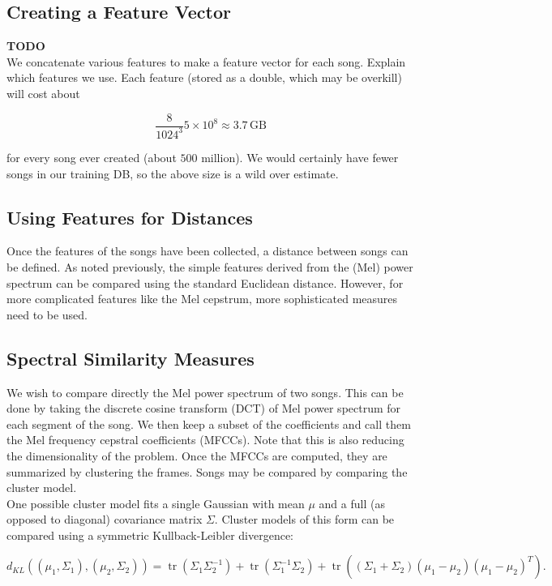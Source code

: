 \documentclass[12pt]{article}
\begin{document}
\subsection{Creating a Feature Vector}
\textbf{TODO}\\
We concatenate various features to make a feature vector for each song.  Explain which features we use.  Each feature (stored as a double, which may be overkill) will cost about 

\[ \dfrac{8}{1024^3}5\times10^8 \approx 3.7\,\text{GB} \] 

\noindent for every song ever created (about $500$ million).  We would certainly have fewer songs in our training DB, so the above size is a wild over estimate.

\subsection{Using Features for Distances}

Once the features of the songs have been collected, a distance between songs can be defined.  As noted previously, the simple features derived from the (Mel) power spectrum can be compared using the standard Euclidean distance.  However, for more complicated features like the Mel cepstrum, more sophisticated measures need to be used.

\subsection{Spectral Similarity Measures}
We wish to compare directly the Mel power spectrum of two songs.  This can be done by taking the discrete cosine transform (DCT) of Mel power spectrum for each segment of the song.  We then keep a subset of the coefficients and call them the Mel frequency cepstral coefficients (MFCCs).  Note that this is also reducing the dimensionality of the problem.  Once the MFCCs are computed, they are summarized by clustering the frames.  Songs may be compared by comparing the cluster model.\\

One possible cluster model fits a single Gaussian with mean $\mu$ and a full (as opposed to diagonal) covariance matrix $\Sigma$.  Cluster models of this form can be compared using a symmetric Kullback-Leibler divergence:

\[ d_{KL}\left(\left(\mu_1,\Sigma_1\right),\left(\mu_2,\Sigma_2\right)\right) = \operatorname{tr}\left(\Sigma_1\Sigma_2^{-1}\right) + \operatorname{tr}\left(\Sigma_1^{-1}\Sigma_2\right) + \operatorname{tr}\left(\left(\Sigma_1+\Sigma_2\right)(\mu_1-\mu_2)(\mu_1-\mu_2)^T\right). \]
\end{document}
